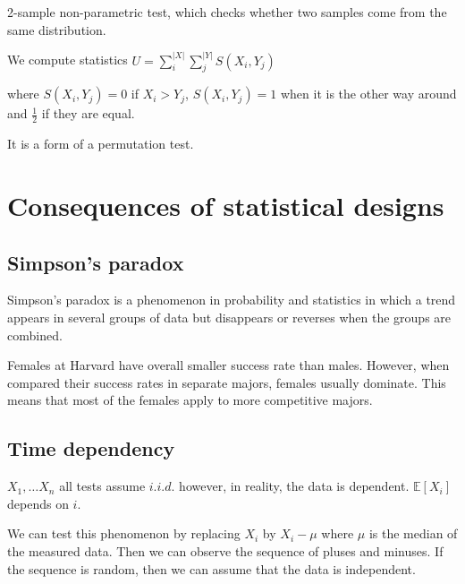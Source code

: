 2-sample non-parametric test, which checks whether two samples come from the same distribution.

We compute statistics $U = \sum^{|X|}_i \sum^{|Y|}_j S(X_i, Y_j)$

where $S(X_i, Y_j) = 0$ if $X_i > Y_j$, $S(X_i, Y_j) = 1$ when it is the other way around and $\frac{1}{2}$ if they are equal.

It is a form of a permutation test.

\section{Consequences of statistical designs}

\subsection{Simpson's paradox}

Simpson's paradox is a phenomenon in probability and statistics in which a trend appears in several groups of data but disappears or reverses when the groups are combined.

\begin{example}
	Females at Harvard have overall smaller success rate than males. However, when compared their success rates in separate majors, females usually dominate. This means that most of the females apply to more competitive majors.
\end{example}

\subsection{Time dependency}

$X_1, \dots X_n$ all tests assume $i.i.d.$ however, in reality, the data is dependent. $\mathbb{E}[X_i]$ depends on $i$.

We can test this phenomenon by replacing $X_i$ by $X_i - \mu$ where $\mu$ is the median of the measured data. Then we can observe the sequence of pluses and minuses. If the sequence is random, then we can assume that the data is independent.
